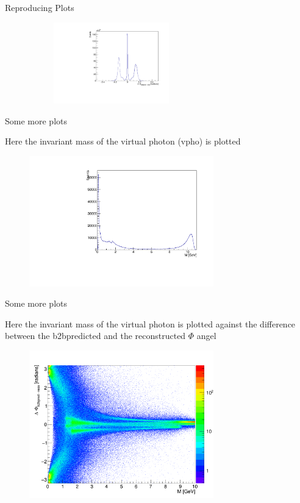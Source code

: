 \documentclass[10pt]{beamer}
\begin{document}
{\begin{frame}{Reproducing Plots}
\begin{figure}
\begin{subfigure}{.5\textwidth}
		\label{fig:sub1}
	\end{subfigure}%
	\begin{subfigure}{.5\textwidth}
		\centering
		\includegraphics[width=5cm]{Plots/DeltaPhi.pdf}
	
		\label{fig:sub2}
	\end{subfigure}

	\label{fig:test}
\end{figure}

\end{frame}


\begin{frame}{Some more plots}

Here the invariant mass of the virtual photon (vpho) is plotted 

	
	\begin{figure}
		\includegraphics[width=8cm]{Plots/vphoM.pdf}
	\end{figure}
	
	
\end{frame}



\begin{frame}{Some more plots}

	Here the invariant mass of the virtual photon is plotted against the difference between the b2bpredicted and the reconstructed $\Phi $ angel
	\begin{figure}
		\includegraphics[width=8cm]{Plots/PhiM.png}
	\end{figure}
	

\end{frame}}
\end{document}
